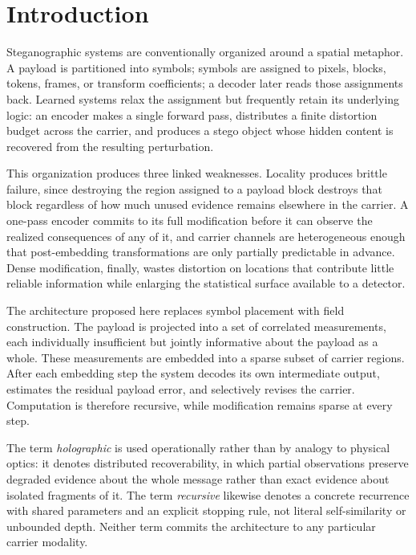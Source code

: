\documentclass[11pt]{article}
\begin{document}
\newpage

\section{Introduction}

Steganographic systems are conventionally organized around a spatial metaphor. A payload is partitioned into symbols; symbols are assigned to pixels, blocks, tokens, frames, or transform coefficients; a decoder later reads those assignments back. Learned systems relax the assignment but frequently retain its underlying logic: an encoder makes a single forward pass, distributes a finite distortion budget across the carrier, and produces a stego object whose hidden content is recovered from the resulting perturbation.

This organization produces three linked weaknesses. Locality produces brittle failure, since destroying the region assigned to a payload block destroys that block regardless of how much unused evidence remains elsewhere in the carrier. A one-pass encoder commits to its full modification before it can observe the realized consequences of any of it, and carrier channels are heterogeneous enough that post-embedding transformations are only partially predictable in advance. Dense modification, finally, wastes distortion on locations that contribute little reliable information while enlarging the statistical surface available to a detector.

The architecture proposed here replaces symbol placement with field construction. The payload is projected into a set of correlated measurements, each individually insufficient but jointly informative about the payload as a whole. These measurements are embedded into a sparse subset of carrier regions. After each embedding step the system decodes its own intermediate output, estimates the residual payload error, and selectively revises the carrier. Computation is therefore recursive, while modification remains sparse at every step.

The term \emph{holographic} is used operationally rather than by analogy to physical optics: it denotes distributed recoverability, in which partial observations preserve degraded evidence about the whole message rather than exact evidence about isolated fragments of it. The term \emph{recursive} likewise denotes a concrete recurrence with shared parameters and an explicit stopping rule, not literal self-similarity or unbounded depth. Neither term commits the architecture to any particular carrier modality.
\end{document}
